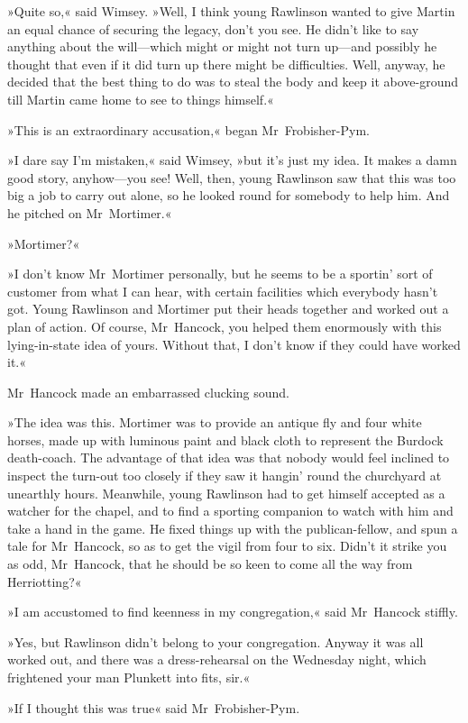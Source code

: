 »Quite so,« said Wimsey. »Well, I think young Rawlinson wanted to give Martin an equal chance of securing the legacy, don't you see. He didn't like to say anything about the will—which might or might not turn up—and possibly he thought that even if it did turn up there might be difficulties. Well, anyway, he decided that the best thing to do was to steal the body and keep it above-ground till Martin came home to see to things himself.«

»This is an extraordinary accusation,« began Mr~Frobisher-Pym.

»I dare say I'm mistaken,« said Wimsey, »but it's just my idea. It makes a damn good story, anyhow—you see! Well, then, young Rawlinson saw that this was too big a job to carry out alone, so he looked round for somebody to help him. And he pitched on Mr~Mortimer.«

»Mortimer?«

»I don't know Mr~Mortimer personally, but he seems to be a sportin' sort of customer from what I can hear, with certain facilities which everybody hasn't got. Young Rawlinson and Mortimer put their heads together and worked out a plan of action. Of course, Mr~Hancock, you helped them enormously with this lying-in-state idea of yours. Without that, I don't know if they could have worked it.«

Mr~Hancock made an embarrassed clucking sound.

»The idea was this. Mortimer was to provide an antique fly and four white horses, made up with luminous paint and black cloth to represent the Burdock death-coach. The advantage of that idea was that nobody would feel inclined to inspect the turn-out too closely if they saw it hangin' round the churchyard at unearthly hours. Meanwhile, young Rawlinson had to get himself accepted as a watcher for the chapel, and to find a sporting companion to watch with him and take a hand in the game. He fixed things up with the publican-fellow, and spun a tale for Mr~Hancock, so as to get the vigil from four to six. Didn't it strike you as odd, Mr~Hancock, that he should be so keen to come all the way from Herriotting?«

»I am accustomed to find keenness in my congregation,« said Mr~Hancock stiffly.

»Yes, but Rawlinson didn't belong to your congregation. Anyway it was all worked out, and there was a dress-rehearsal on the Wednesday night, which frightened your man Plunkett into fits, sir.«

»If I thought this was true\longdash« said Mr~Frobisher-Pym.

